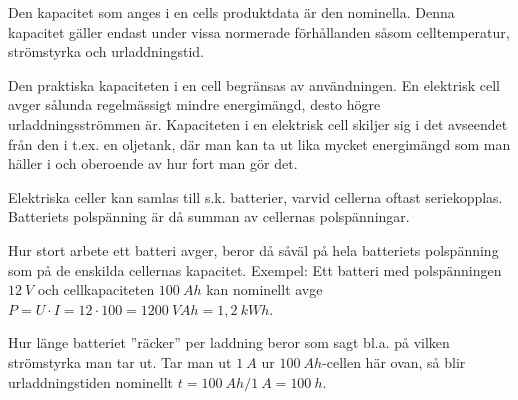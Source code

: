 Den kapacitet som anges i en cells produktdata är den nominella.
Denna kapacitet gäller endast under vissa normerade förhållanden såsom
celltemperatur, strömstyrka och urladdningstid.

Den praktiska kapaciteten i en cell begränsas av användningen.
En elektrisk cell avger sålunda regelmässigt mindre energimängd, desto högre
urladdningsströmmen är.
Kapaciteten i en elektrisk cell skiljer sig i det avseendet från den i
t.ex. en oljetank, där man kan ta ut lika mycket energimängd som man häller i
och oberoende av hur fort man gör det.

Elektriska celler kan samlas till s.k. batterier, varvid cellerna oftast
seriekopplas.
Batteriets polspänning är då summan av cellernas polspänningar.

Hur stort arbete ett batteri avger, beror då såväl på hela batteriets
polspänning som på de enskilda cellernas kapacitet.
Exempel:
Ett batteri med polspänningen \(12\ V\) och cellkapaciteten \(100\ Ah\) kan
nominellt avge
\(P = U \cdot I = 12 \cdot 100 = 1200\ VAh = 1,2\ kWh\).

Hur länge batteriet ''räcker'' per laddning beror som sagt bl.a. på vilken
strömstyrka man tar ut.
Tar man ut \(1\ A\) ur \(100\ Ah\)-cellen här ovan, så blir urladdningstiden
nominellt \(t = 100\ Ah/1\ A = 100\ h\).
